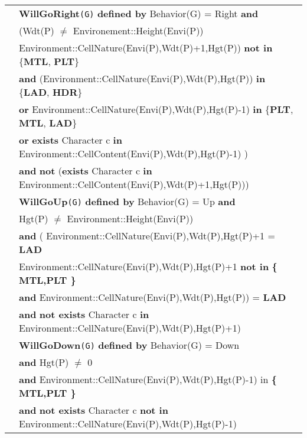 \documentclass{article}
\begin{document}
\begin{tabular}{rl}
& \textbf{WillGoRight}\texttt{(G)} \textbf{defined by}  \textrm{Behavior(G)  = Right} \textbf{and}\\

&  \quad (\textrm{Wdt(P)} $\neq$ \textrm{Environement::Height(Envi(P))} \\ & \textrm{Environment::CellNature(Envi(P),Wdt(P)+1,Hgt(P))} \textbf{not in} \{\textbf{MTL}, \textbf{PLT}\} \\
& \quad\quad \textbf{and} (\textrm{Environment::CellNature(Envi(P),Wdt(P),Hgt(P))} \textbf{in} \{\textbf{LAD}, \textbf{HDR}\} \\
& \quad\quad\quad\quad \textbf{or} \textrm{Environment::CellNature(Envi(P),Wdt(P),Hgt(P)-1)} \textbf{in} \{\textbf{PLT}, \textbf{MTL}, \textbf{LAD}\} \\
& \quad\quad\quad\quad \textbf{or} \textbf{exists} \textrm{Character} c \textbf{in} \textrm{Environment::CellContent(Envi(P),Wdt(P),Hgt(P)-1)} ) \\
& \quad\quad \textbf{and} \textbf{not} (\textbf{exists} \textrm{Character} c \textbf{in} \textrm{Environment::CellContent(Envi(P),Wdt(P)+1,Hgt(P))}) \\
& \textbf{WillGoUp}\texttt{(G)} \textbf{defined by}  \textrm{Behavior(G)  = Up} \textbf{and}\\

&  \quad\textrm{Hgt(P)} $\neq$ \textrm{Environment::Height(Envi(P))} \\
& \quad \textbf{and} (
    \textrm{Environment::CellNature(Envi(P),Wdt(P),Hgt(P)+1} = \textbf{LAD} \\
& \quad\quad  \textrm{Environment::CellNature(Envi(P),Wdt(P),Hgt(P)+1} \textbf{not in } \textbf{ \{ MTL,PLT \}} \\
& \quad \textbf{and} \textrm{Environment::CellNature(Envi(P),Wdt(P),Hgt(P))} = \textbf{LAD} \\
& \quad \textbf{and} \textbf{not exists} \textrm{Character} c \textbf{in} \textrm{Environment::CellNature(Envi(P),Wdt(P),Hgt(P)+1)} \\

& \textbf{WillGoDown}\texttt{(G)} \textbf{defined by}  \textrm{Behavior(G)  = Down} \\
& \quad  \textbf{and} \textrm{Hgt(P)} $\neq$ 0 \\
& \quad \textbf{and} \textrm{Environment::CellNature(Envi(P),Wdt(P),Hgt(P)-1)} \textrm{in} \textbf{ \{ MTL,PLT \} } \\
& \quad \textbf{and} \textbf{not exists} \textrm{Character} c \textbf{ not in} \textrm{Environment::CellNature(Envi(P),Wdt(P),Hgt(P)-1)} \\


\end{tabular}
\end{document}
